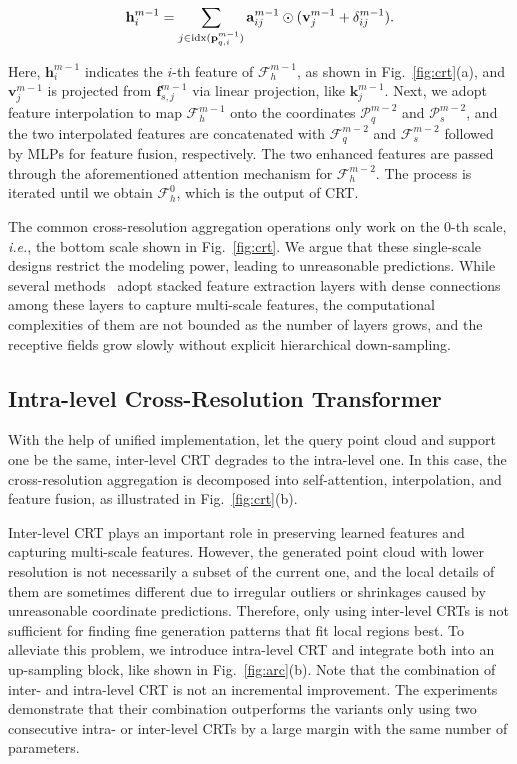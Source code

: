 \documentclass[letterpaper]{article} %
\newcommand{\ve}[1]{\mathbf{#1}} %
\begin{document}
\begin{equation}
\ve{h}_i^{m-1}  = \sum_{j \in {\rm idx}(\ve{p}^{m-1}_{q, i}) }\ve{a}_{ij}^{m-1} \odot  (\ve{v}_j^{m-1} + \delta^{m-1}_{ij}).
\end{equation}

{\noindent}Here, $\ve{h}_i^{m-1}$ indicates the $i$-th feature of $\mathcal{F}_h^{m-1}$, as shown in Fig.~\ref{fig:crt}(a), and $\ve{v}^{m-1}_j$ is projected from $\ve{f}^{m-1}_{s, j}$ via linear projection, like $\ve{k}^{m-1}_j$.
Next, we adopt feature interpolation \cite{qi2017pointnet++} to map $\mathcal{F}_h^{m-1}$ onto the coordinates $\mathcal{P}_q^{m-2}$ and $\mathcal{P}_s^{m-2}$,
and the two interpolated features are concatenated with $\mathcal{F}_q^{m-2}$ and $\mathcal{F}_s^{m-2}$ followed by MLPs for feature fusion, respectively.
The two enhanced features are passed through the aforementioned attention mechanism for $\mathcal{F}_h^{m-2}$.
The process is iterated until we obtain $\mathcal{F}_h^{0}$, which is the output of CRT.

The common cross-resolution aggregation operations only work on the $0$-th scale, {\em i.e.}, the bottom scale shown in Fig.~\ref{fig:crt}.
We argue that these single-scale designs restrict the modeling power, leading to unreasonable predictions.
While several methods~\cite{qian2021pu, he2023grad} adopt stacked feature extraction layers with dense connections among these layers to capture multi-scale features, the computational complexities of them are not bounded as the number of layers grows, and the receptive fields grow slowly without explicit hierarchical down-sampling.


\subsection{Intra-level Cross-Resolution Transformer}
With the help of unified implementation, let the query point cloud and support one be the same, inter-level CRT degrades to the intra-level one.
In this case, the cross-resolution aggregation is decomposed into self-attention, interpolation, and feature fusion, as illustrated in Fig.~\ref{fig:crt}(b).

Inter-level CRT plays an important role in preserving learned features and capturing multi-scale features.
However, the generated point cloud with lower resolution is not necessarily a subset of the current one, and the local details of them are sometimes different due to  irregular outliers or shrinkages caused by unreasonable coordinate predictions.
Therefore, only using inter-level CRTs is not sufficient for finding fine generation patterns that fit local regions best.
To alleviate this problem, we introduce intra-level  CRT and integrate both into an up-sampling block, like shown in Fig.~\ref{fig:arc}(b).
Note that the combination of inter- and intra-level CRT is not an incremental improvement.
The experiments demonstrate that their combination outperforms the variants only using two consecutive intra- or inter-level CRTs by a large margin  with the same number of parameters.
\end{document}
